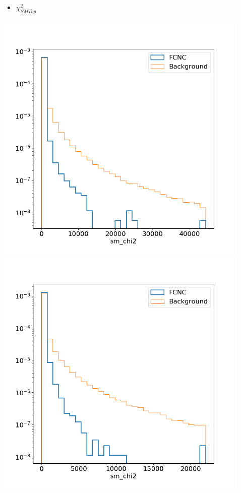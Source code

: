 \documentclass[10pt]{beamer}
\begin{document}
{\begin{columns}
\begin{column}{0.33\textwidth}
\end{column}
\begin{column}{0.33\textwidth}
\begin{itemize}
\item$\chi^2_{SMTop}$
\end{itemize}
\includegraphics[width=.8\textwidth]{Images/ejetsvarplots/sm_chi2.png} \\
\includegraphics[width=.8\textwidth]{Images/mujetsvarplots/sm_chi2.png}
\end{column}
\begin{column}{0.33\textwidth}
\begin{itemize}

\end{itemize}
\end{column}
\end{columns}}
\end{document}
